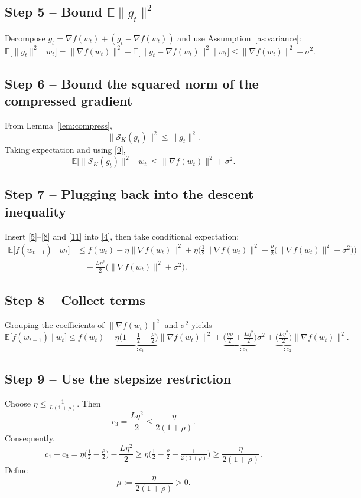 \documentclass{article}
\newcommand{\topk}[1]{\mathcal{S}_K(#1)}
\begin{document}
\subsection*{Step 5 – Bound $\mathbb{E}\|g_t\|^{2}$}
Decompose $g_t=\nabla f(w_t)+(g_t-\nabla f(w_t))$ and use Assumption~\ref{as:variance}:
\[
\mathbb{E}\big[\|g_t\|^{2}\mid w_t\big]
= \|\nabla f(w_t)\|^{2}
+\mathbb{E}\big[\|g_t-\nabla f(w_t)\|^{2}\mid w_t\big]
\le \|\nabla f(w_t)\|^{2}+\sigma^{2}. \tag{9}
\]

\subsection*{Step 6 – Bound the squared norm of the compressed gradient}
From Lemma~\ref{lem:compress},
\[
\|\topk{g_t}\|^{2}
\le \|g_t\|^{2}. \tag{10}
\]
Taking expectation and using \eqref{9},
\[
\mathbb{E}\big[\|\topk{g_t}\|^{2}\mid w_t\big]
\le \|\nabla f(w_t)\|^{2}+\sigma^{2}. \tag{11}
\]

\subsection*{Step 7 – Plugging back into the descent inequality}
Insert \eqref{5}–\eqref{8} and \eqref{11} into \eqref{4}, then take conditional expectation:
\[
\begin{aligned}
\mathbb{E}\big[f(w_{t+1})\mid w_t\big]
&\le f(w_t)-\eta\|\nabla f(w_t)\|^{2}
+\eta\Big(\frac{1}{2}\|\nabla f(w_t)\|^{2}
+\frac{\rho}{2}\big(\|\nabla f(w_t)\|^{2}+\sigma^{2}\big)\Big)   \\
&\quad +\frac{L\eta^{2}}{2}\big(\|\nabla f(w_t)\|^{2}+\sigma^{2}\big).
\end{aligned}
\tag{12}
\]

\subsection*{Step 8 – Collect terms}
Grouping the coefficients of $\|\nabla f(w_t)\|^{2}$ and $\sigma^{2}$ yields
\[
\mathbb{E}\big[f(w_{t+1})\mid w_t\big]
\le f(w_t)
-\underbrace{\eta\Big(1-\tfrac12-\tfrac{\rho}{2}\Big)}_{=:c_1}\|\nabla f(w_t)\|^{2}
+\underbrace{\Big(\tfrac{\eta\rho}{2}+\tfrac{L\eta^{2}}{2}\Big)}_{=:c_2}\sigma^{2}
+\underbrace{\Big(\tfrac{L\eta^{2}}{2}\Big)}_{=:c_3}\|\nabla f(w_t)\|^{2}.
\tag{13}
\]

\subsection*{Step 9 – Use the stepsize restriction}
Choose $\eta\le\frac{1}{L(1+\rho)}$. Then
\[
c_3=\frac{L\eta^{2}}{2}\le\frac{\eta}{2(1+\rho)} .
\]
Consequently,
\[
c_1-c_3
=\eta\Big(\tfrac12-\tfrac{\rho}{2}\Big)-\frac{L\eta^{2}}{2}
\ge\eta\Big(\tfrac12-\tfrac{\rho}{2}-\tfrac{1}{2(1+\rho)}\Big)
\ge\frac{\eta}{2(1+\rho)} . \tag{14}
\]
Define
\[
\mu:=\frac{\eta}{2(1+\rho)}>0 .
\]
\end{document}

